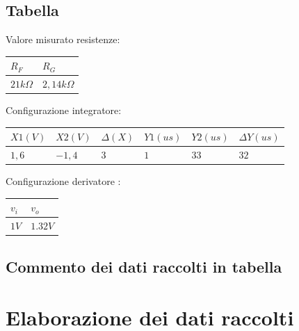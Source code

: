 \documentclass[12pt]{article}
\begin{document}
\subsection{Tabella}
Valore misurato resistenze:\\
\begin{center}
        \begin{tabular}{|p{2cm}|p{2cm}|}
            \hline
            \rowcolor{RoyalBlue} $R_F$ & $R_G$ \\
            \hline
            \rowcolor{CornflowerBlue} $21k\Omega$ & $2,14k\Omega$  \\ 
            \hline
        \end{tabular}
        \label{Valore resistenze}
\end{center}
\noindent
Configurazione integratore:\\
\begin{center}
    \begin{tabular}{|p{2cm} |p{2cm}|p{2cm} |p{2cm}|p{2cm} |p{2cm}|}
        \hline
        \rowcolor{RoyalBlue} $X1(V)$ & $X2(V)$& $\Delta (X)$ & $Y1(us)$ & $Y2(us)$ & $\Delta Y(us)$   \\
        \hline
        \rowcolor{CornflowerBlue} $1,6$ & $-1,4$ & $3$ & $1$ & $33$  & $32$\\ 
        \hline
    \end{tabular}
\end{center}

\noindent Configurazione derivatore :\\
\begin{center}
    \begin{tabular}{|p{2cm} |p{2cm}|}
        \hline
        \rowcolor{RoyalBlue} $v_i$ & $v_o$  \\
        \hline
        \rowcolor{CornflowerBlue} $1V$ & $1.32V$  \\ 
        \hline
    \end{tabular}
    \label{Valore resistenze}
\end{center}

\subsection{Commento dei dati raccolti in tabella}

\section{Elaborazione dei dati raccolti}
\end{document}
